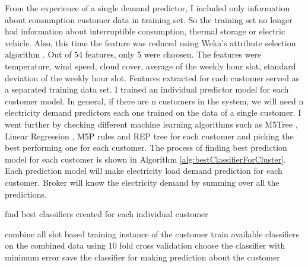 From the experience of a single demand predictor, I included only information about consumption customer data in training set. So the training set no longer had information about interruptible consumption, thermal storage or electric vehicle. Also, this time the feature was reduced using Weka's attribute selection algorithm \cite{witten2005data}. Out of 54 features, only 5 were choosen. The features were temperature, wind speed, cloud cover, average of the weekly hour slot, standard deviation of the weekly hour slot. Features extracted for each customer served as a separated training data set. I trained an individual predictor model for each customer model. In general, if there are n customers in the system, we will need n electricity demand predictors each one trained on the data of a single customer. I went further by checking different machine learning algorithms such as M5Tree \cite{witten2005data}, Linear Regression \cite{witten2005data}, M5P rules \cite{witten2005data} and REP tree \cite{witten2005data} for each customer and picking the best performing one for each customer. The process of finding best prediction model for each customer is shown in Algorithm \ref{alg:bestClassifierForCluster}. Each prediction model will make electricity load demand prediction for each customer. Broker will know the electricity demand by summing over all the predictions.

\begin{algorithm}[!h]
\caption{find best classifiers created for each individual customer}
\begin{algorithmic} [1]
    \STATE combine all slot based training instance of the customer
    \STATE train available classifiers on the combined data using 10 fold cross validation
    \STATE choose the classifier with minimum error
    \STATE save the classifier for making prediction about the customer
\ENDFOR 
\end{algorithmic}
\label{alg:bestClassifierIndiv}
\end{algorithm}



